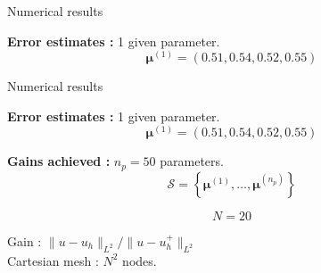 \begin{frame}{Numerical results}
	\hspace{-5pt}\begin{minipage}[t]{0.46\linewidth}
		\textbf{Error estimates :} 1 given parameter.
		$$\bm{\mu}^{(1)}=(0.51,0.54,0.52,0.55)$$
		\vspace{-35pt}
		\begin{figure}[H]
		\end{figure}
	\end{minipage} \qquad \small
	\begin{minipage}[t]{0.48\linewidth}
	\end{minipage}
\end{frame}

\begin{frame}[noframenumbering]{Numerical results}
	\hspace{-5pt}\begin{minipage}[t]{0.46\linewidth}
		\textbf{Error estimates :} 1 given parameter.
		$$\bm{\mu}^{(1)}=(0.51,0.54,0.52,0.55)$$
		\vspace{-35pt}
		\begin{figure}[H]
		\end{figure}
	\end{minipage} \qquad \small
	\begin{minipage}[t]{0.48\linewidth}
		\textbf{Gains achieved :} $n_p=50$ parameters.
		$$\mathcal{S}=\left\{\bm{\mu}^{(1)},\dots,\bm{\mu}^{(n_p)}\right\}$$
		\vspace{-15pt}
		\begin{table}[H]
		\end{table}

		\normalsize\centering\vspace{-20pt}
		$$N=20$$

		\vspace{-5pt}
		Gain : $\| u-u_h\|_{L^2} / \| u-u_h^+\|_{L^2}$ \\
		
		\small\vspace{8pt}
		Cartesian mesh : $N^2$ nodes.
	\end{minipage}
\end{frame}

